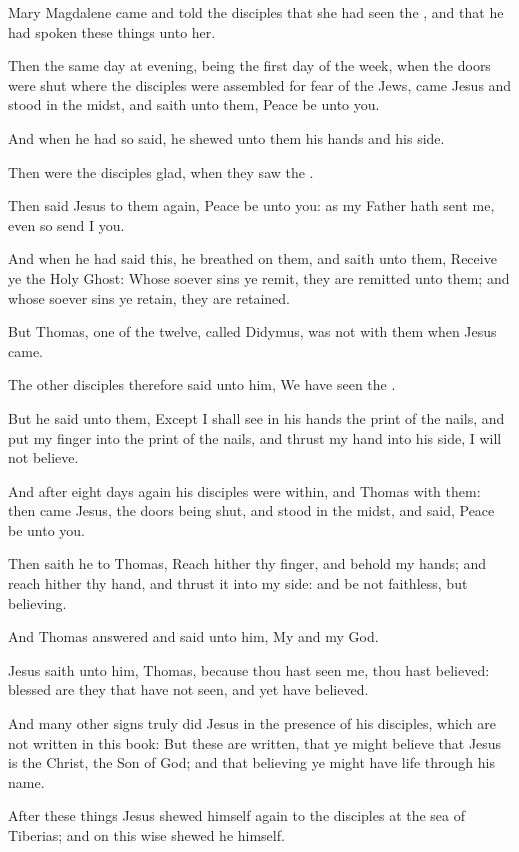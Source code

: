 \Verse Mary Magdalene came and told the disciples that she had seen the \LORD, and that he had spoken these things unto her.

\Verse Then the same day at evening, being the first day of the week, when the doors were shut where the disciples were assembled for fear of the Jews, came Jesus and stood in the midst, and saith unto them, Peace be unto you.

\Verse And when he had so said, he shewed unto them his hands and his side.

Then were the disciples glad, when they saw the \LORD.

\Verse Then said Jesus to them again, Peace be unto you: as my Father hath sent me, even so send I you.

\Verse And when he had said this, he breathed on them, and saith unto them, Receive ye the Holy Ghost: \Verse Whose soever sins ye remit, they are remitted unto them; and whose soever sins ye retain, they are retained.

\Verse But Thomas, one of the twelve, called Didymus, was not with them when Jesus came.

\Verse The other disciples therefore said unto him, We have seen the \LORD.

But he said unto them, Except I shall see in his hands the print of the nails, and put my finger into the print of the nails, and thrust my hand into his side, I will not believe.

\Verse And after eight days again his disciples were within, and Thomas with them: then came Jesus, the doors being shut, and stood in the midst, and said, Peace be unto you.

\Verse Then saith he to Thomas, Reach hither thy finger, and behold my hands; and reach hither thy hand, and thrust it into my side: and be not faithless, but believing.

\Verse And Thomas answered and said unto him, My \LORD and my God.

\Verse Jesus saith unto him, Thomas, because thou hast seen me, thou hast believed: blessed are they that have not seen, and yet have believed.

\Verse And many other signs truly did Jesus in the presence of his disciples, which are not written in this book: \Verse But these are written, that ye might believe that Jesus is the Christ, the Son of God; and that believing ye might have life through his name.


\Chapter
\Verse After these things Jesus shewed himself again to the disciples at the sea of Tiberias; and on this wise shewed he himself.

